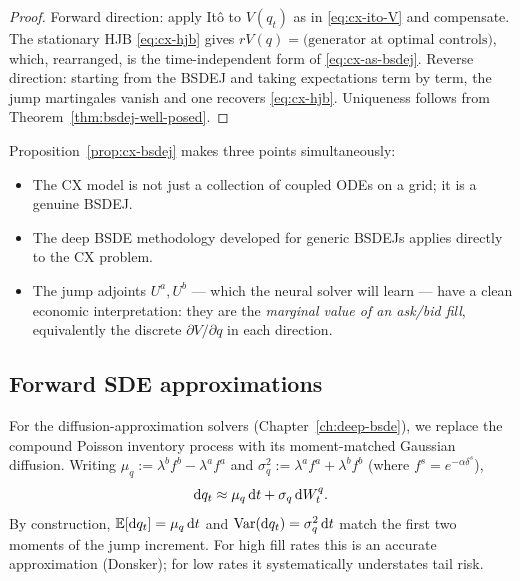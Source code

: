 \begin{proof}
Forward direction: apply It\^o to $V(q_t)$ as in \eqref{eq:cx-ito-V} and compensate. The stationary HJB \eqref{eq:cx-hjb} gives $r V(q) = \text{(generator at optimal controls)}$, which, rearranged, is the time-independent form of \eqref{eq:cx-as-bsdej}. Reverse direction: starting from the BSDEJ and taking expectations term by term, the jump martingales vanish and one recovers \eqref{eq:cx-hjb}. Uniqueness follows from Theorem~\ref{thm:bsdej-well-posed}.
\end{proof}

\begin{remark}
Proposition~\ref{prop:cx-bsdej} makes three points simultaneously:
\begin{itemize}
  \item The CX model is not just a collection of coupled ODEs on a grid; it is a genuine BSDEJ.
  \item The deep BSDE methodology developed for generic BSDEJs applies directly to the CX problem.
  \item The jump adjoints $U^a, U^b$ --- which the neural solver will learn --- have a clean economic interpretation: they are the \emph{marginal value of an ask/bid fill}, equivalently the discrete $\partial V / \partial q$ in each direction.
\end{itemize}
\end{remark}

\subsection{Forward SDE approximations}

For the diffusion-approximation solvers (Chapter~\ref{ch:deep-bsde}), we replace the compound Poisson inventory process with its moment-matched Gaussian diffusion. Writing $\mu_q := \lambda^b f^b - \lambda^a f^a$ and $\sigma_q^2 := \lambda^a f^a + \lambda^b f^b$ (where $f^s = e^{-\alpha \delta^s}$),
\begin{equation}
  \mathrm{d} q_t \approx \mu_q \, \mathrm{d} t + \sigma_q \, \mathrm{d} W^q_t.
  \label{eq:cx-diffusion-approx}
\end{equation}
By construction, $\mathbb{E}[\mathrm{d} q_t] = \mu_q \, \mathrm{d} t$ and $\mathrm{Var}(\mathrm{d} q_t) = \sigma_q^2 \, \mathrm{d} t$ match the first two moments of the jump increment. For high fill rates this is an accurate approximation (Donsker); for low rates it systematically understates tail risk.

